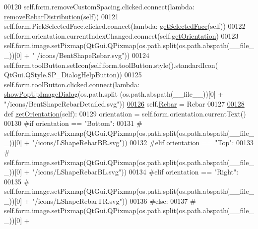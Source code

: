 \begin{DoxyCode}
00120         self.form.removeCustomSpacing.clicked.connect(\textcolor{keyword}{lambda}: 
      \hyperlink{namespaceRebarDistribution_a85270a1b6e8c782a9e0ba54add518f2a}{removeRebarDistribution}(self))
00121         self.form.PickSelectedFace.clicked.connect(\textcolor{keyword}{lambda}: \hyperlink{namespaceRebarfunc_a8c003df49ac5f249bd9ea4acfb7d2f8d}{getSelectedFace}(self))
00122         self.form.orientation.currentIndexChanged.connect(self.\hyperlink{classBentShapeRebar_1_1__BentShapeRebarTaskPanel_ab33579342d5fa4d4bf0bc8c9b9dfa526}{getOrientation})
00123         self.form.image.setPixmap(QtGui.QPixmap(os.path.split(os.path.abspath(\_\_file\_\_))[0] + \textcolor{stringliteral}{"
      /icons/BentShapeRebar.svg"}))
00124         self.form.toolButton.setIcon(self.form.toolButton.style().standardIcon(
      QtGui.QStyle.SP\_DialogHelpButton))
00125         self.form.toolButton.clicked.connect(\textcolor{keyword}{lambda}: \hyperlink{namespacePopUpImage_a8c565620d7de9b4882a44eacb870ad05}{showPopUpImageDialog}(os.path.split
      (os.path.abspath(\_\_file\_\_))[0] + \textcolor{stringliteral}{"/icons/BentShapeRebarDetailed.svg"}))
\hypertarget{BentShapeRebar_8py_source.tex_l00126}{}\hyperlink{classBentShapeRebar_1_1__BentShapeRebarTaskPanel_aae8fd4e66d675c566d0afcee0af2341f}{00126}         self.\hyperlink{classBentShapeRebar_1_1__BentShapeRebarTaskPanel_aae8fd4e66d675c566d0afcee0af2341f}{Rebar} = Rebar
00127 
\hypertarget{BentShapeRebar_8py_source.tex_l00128}{}\hyperlink{classBentShapeRebar_1_1__BentShapeRebarTaskPanel_ab33579342d5fa4d4bf0bc8c9b9dfa526}{00128}     \textcolor{keyword}{def }\hyperlink{classBentShapeRebar_1_1__BentShapeRebarTaskPanel_ab33579342d5fa4d4bf0bc8c9b9dfa526}{getOrientation}(self):
00129         orientation = self.form.orientation.currentText()
00130         \textcolor{comment}{#if orientation == "Bottom":}
00131         \textcolor{comment}{#    self.form.image.setPixmap(QtGui.QPixmap(os.path.split(os.path.abspath(\_\_file\_\_))[0] +
       "/icons/LShapeRebarBR.svg"))}
00132         \textcolor{comment}{#elif orientation == "Top":}
00133         \textcolor{comment}{#    self.form.image.setPixmap(QtGui.QPixmap(os.path.split(os.path.abspath(\_\_file\_\_))[0] +
       "/icons/LShapeRebarBL.svg"))}
00134         \textcolor{comment}{#elif orientation == "Right":}
00135         \textcolor{comment}{#    self.form.image.setPixmap(QtGui.QPixmap(os.path.split(os.path.abspath(\_\_file\_\_))[0] +
       "/icons/LShapeRebarTR.svg"))}
00136         \textcolor{comment}{#else:}
00137         \textcolor{comment}{#    self.form.image.setPixmap(QtGui.QPixmap(os.path.split(os.path.abspath(\_\_file\_\_))[0] +
}
\end{DoxyCode}
